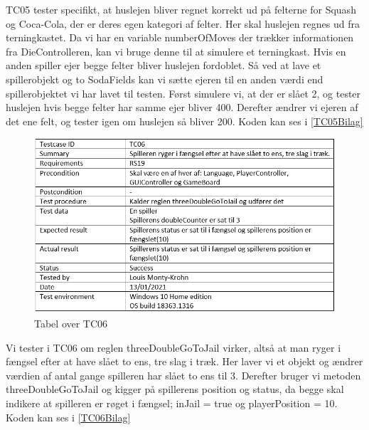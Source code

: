 \begin{flushleft}
TC05 tester specifikt, at huslejen bliver regnet korrekt ud på felterne for Squash og Coca-Cola, der er deres egen kategori af felter.
Her skal huslejen regnes ud fra terningkastet. Da vi har en variable numberOfMoves der trækker informationen fra DieControlleren, kan vi bruge denne til at simulere et terningkast. Hvis en anden spiller ejer begge felter bliver huslejen fordoblet.
Så ved at lave et spillerobjekt og to SodaFields kan vi sætte ejeren til en anden værdi end spillerobjektet vi har lavet til testen.
Først simulere vi, at der er slået 2, og tester huslejen hvis begge felter har samme ejer bliver 400. Derefter ændrer vi ejeren af det ene felt, og tester igen om huslejen så bliver 200. Koden kan ses i \ref{TC05Bilag}

\begin{figure}[H] %
    \centering
    \includegraphics[width=14cm]{Report/figures/Unittests/TC06.PNG}
    \caption{Tabel over TC06}
    \label{Testcase06}
\end{figure}

Vi tester i TC06 om reglen threeDoubleGoToJail virker, altså at man ryger i fængsel efter at have slået to ens, tre slag i træk.
Her laver vi et objekt og ændrer værdien af antal gange spilleren har slået to ens til 3. Derefter bruger vi metoden threeDoubleGoToJail og kigger på spillerens position og status, da begge skal indikere at spilleren er røget i fængsel; inJail = true og playerPosition = 10.
Koden kan ses i \ref{TC06Bilag}


\end{flushleft}
